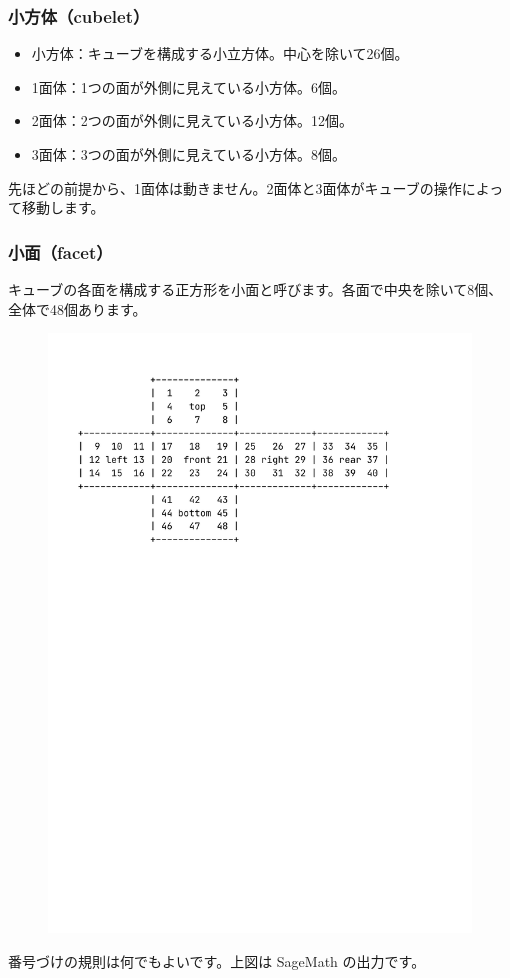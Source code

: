 \documentclass{beamer}
\begin{document}
\begin{frame}
    \frametitle{小方体（cubelet）}

    \begin{itemize}
        \item 小方体：キューブを構成する小立方体。中心を除いて26個。
        \item 1面体：1つの面が外側に見えている小方体。6個。
        \item 2面体：2つの面が外側に見えている小方体。12個。
        \item 3面体：3つの面が外側に見えている小方体。8個。
    \end{itemize}

    \bigskip

    先ほどの前提から、1面体は動きません。2面体と3面体がキューブの操作によって移動します。
\end{frame}

\begin{frame}
    \frametitle{小面（facet）}

    キューブの各面を構成する正方形を小面と呼びます。各面で中央を除いて8個、全体で48個あります。

    \begin{figure}
        \includegraphics[scale=0.5]{images/display2d.pdf}
    \end{figure}

    番号づけの規則は何でもよいです。上図は SageMath の出力です。
\end{frame}
\end{document}
